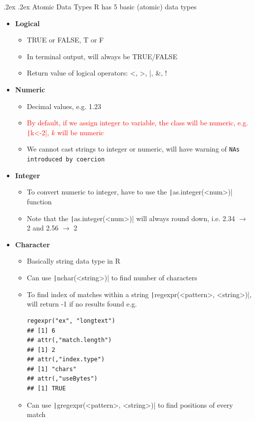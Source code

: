 \documentclass[landscape,a4paper]{article}
\makeatletter
\renewcommand{\subsection}{\@startsection{subsection}{1}{0mm}%
	{.2ex}%
	{.2ex}%
	{\sffamily\bfseries}}
\makeatother
\begin{document}
\begin{multicols*}{4}
		\subsection{Atomic Data Types}
		R has 5 basic (atomic) data types
		\begin{itemize}
			\item \textbf{Logical}
			\begin{itemize}
				\item TRUE or FALSE, T or F
				\item In terminal output, will always be TRUE/FALSE
				\item Return value of logical operators: <, >, |, \&, !
			\end{itemize}
			\item \textbf{Numeric}
			\begin{itemize}
				\item Decimal values, e.g. 1.23
				\item \textcolor{red}{By default, if we assign integer to variable, the class will be numeric, e.g. \texttt|k<-2|, $k$ will be numeric}
				\item We cannot cast strings to integer or numeric, will have warning of \texttt{NAs introduced by coercion}
			\end{itemize}
			\item \textbf{Integer}
			\begin{itemize}
				\item To convert numeric to integer, have to use the \texttt|as.integer(<num>)| function
				\item Note that the \texttt|as.integer(<num>)| will always round down, i.e. 2.34 $\rightarrow$ 2 and 2.56 $\rightarrow$ 2
			\end{itemize}
			\item \textbf{Character}
			\begin{itemize}
				\item Basically string data type in R
				\item Can use \texttt|nchar(<string>)| to find number of characters
				\item To find index of matches within a string \texttt|regexpr(<pattern>, <string>)|, will return -1 if no results found e.g.
				\begin{verbatim}
regexpr("ex", "longtext")
## [1] 6
## attr(,"match.length")
## [1] 2
## attr(,"index.type")
## [1] "chars"
## attr(,"useBytes")
## [1] TRUE
				\end{verbatim}
				\item Can use \texttt|gregexpr(<pattern>, <string>)| to find positions of every match

\end{itemize}
\end{itemize}
\end{multicols*}
\end{document}
